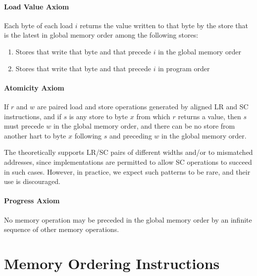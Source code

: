 \newcommand{\loadvalueaxiom}{
  Each byte of each load $i$ returns the value written to that byte by the store that is the latest in global memory order among the following stores:
  \begin{enumerate}
    \item Stores that write that byte and that precede $i$ in the global memory order
    \item Stores that write that byte and that precede $i$ in program order
  \end{enumerate}
}

\newcommand{\atomicityaxiom}{If $r$ and $w$ are paired load and store operations generated by aligned LR and SC instructions, and if $s$ is any store to byte $x$ from which $r$ returns a value, then $s$ must precede $w$ in the global memory order, and there can be no store from another hart to byte $x$ following $s$ and preceding $w$ in the global memory order.}

\newcommand{\progressaxiom}{No memory operation may be preceded in the global memory order by an infinite sequence of other memory operations.}

\paragraph{Load Value Axiom}
\label{rvwmo:ax:load}
\loadvalueaxiom

\paragraph{Atomicity Axiom}
\label{rvwmo:ax:atom}
\atomicityaxiom

\begin{commentary}
  The  theoretically supports LR/SC pairs of different widths and/or to mismatched addresses, since implementations are permitted to allow SC operations to succeed in such cases.  However, in practice, we expect such patterns to be rare, and their use is discouraged.
\end{commentary}

\paragraph{Progress Axiom}
\label{rvwmo:ax:prog}
\progressaxiom

\section{Memory Ordering Instructions}
\label{sec:fence}

